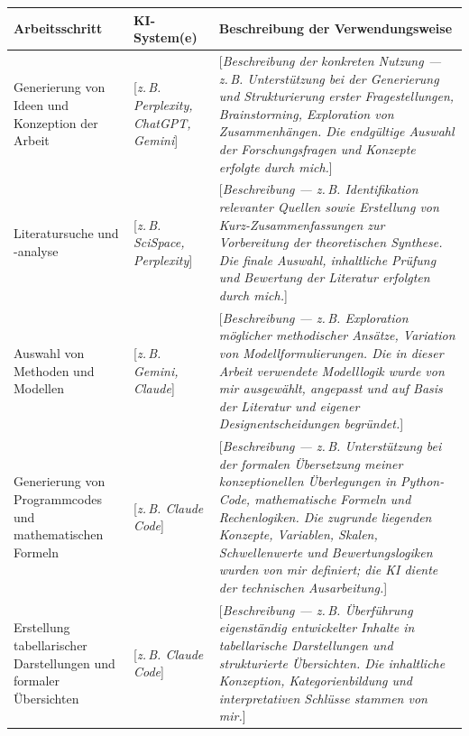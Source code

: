 \documentclass[11pt,a4paper,oneside]{book}
\begin{document}
\begin{longtable}{@{}p{3.5cm}p{3.0cm}p{6.1cm}@{}}
\toprule
\textbf{Arbeitsschritt} & \textbf{KI-System(e)} & \textbf{Beschreibung der Verwendungsweise} \\
\midrule
\endhead

Generierung von Ideen und Konzeption der Arbeit
& [\textit{z.\,B. Perplexity, ChatGPT, Gemini}] %
& [\textit{Beschreibung der konkreten Nutzung — z.\,B. Unterstützung bei der Generierung und Strukturierung erster Fragestellungen, Brainstorming, Exploration von Zusammenhängen. Die endgültige Auswahl der Forschungsfragen und Konzepte erfolgte durch mich.}] \\[0.3cm] %

Literatursuche und -analyse
& [\textit{z.\,B. SciSpace, Perplexity}] %
& [\textit{Beschreibung — z.\,B. Identifikation relevanter Quellen sowie Erstellung von Kurz-Zusammenfassungen zur Vorbereitung der theoretischen Synthese. Die finale Auswahl, inhaltliche Prüfung und Bewertung der Literatur erfolgten durch mich.}] \\[0.3cm] %

Auswahl von Methoden und Modellen
& [\textit{z.\,B. Gemini, Claude}] %
& [\textit{Beschreibung — z.\,B. Exploration möglicher methodischer Ansätze, Variation von Modellformulierungen. Die in dieser Arbeit verwendete Modelllogik wurde von mir ausgewählt, angepasst und auf Basis der Literatur und eigener Designentscheidungen begründet.}] \\[0.3cm] %

Generierung von Programmcodes und mathematischen Formeln
& [\textit{z.\,B. Claude Code}] %
& [\textit{Beschreibung — z.\,B. Unterstützung bei der formalen Übersetzung meiner konzeptionellen Überlegungen in Python-Code, mathematische Formeln und Rechenlogiken. Die zugrunde liegenden Konzepte, Variablen, Skalen, Schwellenwerte und Bewertungslogiken wurden von mir definiert; die KI diente der technischen Ausarbeitung.}] \\[0.3cm] %

Erstellung tabellarischer Darstellungen und formaler Übersichten
& [\textit{z.\,B. Claude Code}] %
& [\textit{Beschreibung — z.\,B. Überführung eigenständig entwickelter Inhalte in tabellarische Darstellungen und strukturierte Übersichten. Die inhaltliche Konzeption, Kategorienbildung und interpretativen Schlüsse stammen von mir.}] \\[0.3cm] %


\end{longtable}
\end{document}
